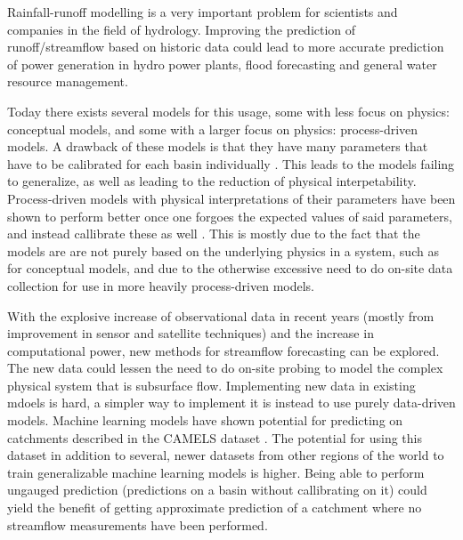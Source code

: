 Rainfall-runoff modelling is a very important problem for scientists and 
companies in the field of hydrology. Improving the prediction of runoff/streamflow 
based on historic data could lead to more accurate prediction of power generation 
in hydro power plants, flood forecasting and general water resource management.

Today there exists several models for this usage, some with less focus on physics: 
conceptual models, and some with a larger focus on physics: process-driven models. 
A drawback of these models is that they have many parameters that have to be 
calibrated for each basin individually \citep{VICbench, BiasVarianceVIC, lstm_third_paper}. 
This leads to the models failing to generalize, as well as leading to the 
reduction of physical interpetability. Process-driven models with physical interpretations 
of their parameters have been shown to perform better once one forgoes the expected 
values of said parameters, and instead callibrate these as well \citep[e.g.][]{VICbench, BiasVarianceVIC}.
This is mostly due to the fact that the models are are not purely based on the 
underlying physics in a system, such as for conceptual models, and due to 
the otherwise excessive need to do on-site data collection for use in more heavily 
process-driven models. 

With the explosive increase of observational data in recent years (mostly from 
improvement in sensor and satellite techniques) and the increase in computational 
power, new methods for streamflow forecasting can be explored. The new data could 
lessen the need to do on-site probing to model the complex physical system that is 
subsurface flow. Implementing new data in existing mdoels is hard, a simpler 
way to implement it is instead to use purely data-driven models. Machine learning 
models have shown potential for predicting on catchments described in the CAMELS 
dataset \citep{lstm_first_paper, CAMELS_US}. The potential for using this dataset in addition to several, 
newer datasets from other regions of the world to train generalizable 
machine learning models is higher. Being able to perform ungauged prediction 
(predictions on a basin without callibrating on it) could yield the benefit of 
getting approximate prediction of a catchment where no streamflow measurements 
have been performed.

